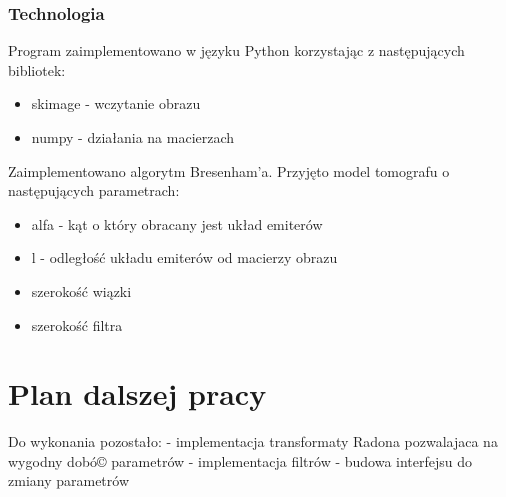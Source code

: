 \documentclass[A_4paper,12pt]{article}
\begin{document}
\subsubsection{Technologia}
Program zaimplementowano w języku Python korzystając z następujących bibliotek:
\begin{itemize}
\item skimage - wczytanie obrazu
\item numpy - działania na macierzach
\end{itemize}
Zaimplementowano algorytm Bresenham'a.
Przyjęto model tomografu o następujących parametrach:
\begin{itemize}
\item alfa - kąt o który obracany jest układ emiterów
\item l - odległość układu emiterów od macierzy obrazu
\item szerokość wiązki
\item szerokość filtra
\end{itemize}

\section{Plan dalszej pracy}
Do wykonania pozostało:
- implementacja transformaty Radona pozwalajaca na wygodny dobó© parametrów
- implementacja filtrów
- budowa interfejsu do zmiany parametrów



\end{document}
